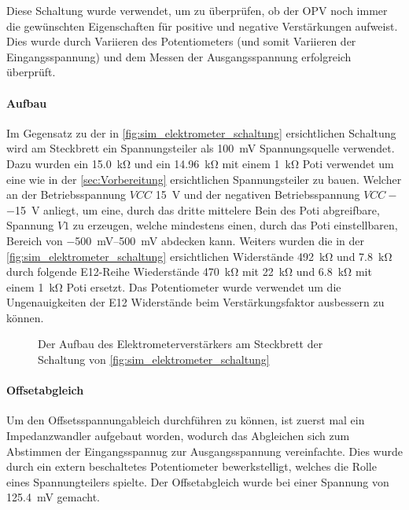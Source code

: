 \documentclass[12pt,english,ngerman]{scrartcl}
\begin{document}
Diese Schaltung wurde verwendet, um zu überprüfen, ob der OPV noch immer die
gewünschten Eigenschaften für positive und negative Verstärkungen aufweist. Dies
wurde durch Variieren des Potentiometers (und somit Variieren der
Eingangsspannung) und dem Messen der Ausgangsspannung erfolgreich überprüft.

\paragraph{Aufbau}
Im Gegensatz zu der in \autoref{fig:sim_elektrometer_schaltung} ersichtlichen
Schaltung wird am Steckbrett ein Spannungsteiler als \SI{100}{mV}
Spannungsquelle verwendet. Dazu wurden ein \SI{15.0}{\kilo\ohm} und ein
\SI{14.96}{\kilo\ohm} mit einem \SI{1}{\kilo\ohm} Poti verwendet um eine wie in
der \autoref{sec:Vorbereitung} ersichtlichen Spannungsteiler zu bauen. Welcher
an der Betriebsspannung $VCC$ \SI{+15}{\volt} und der negativen
Betriebsspannung $VCC-$ \SI{-15}{\volt} anliegt, um eine, durch das dritte
mittelere Bein des Poti abgreifbare, Spannung $V1$ zu erzeugen, welche
mindestens einen, durch das Poti einstellbaren, Bereich von
\SIrange{-500}{500}{\milli\volt} abdecken kann. Weiters wurden die in der
\autoref{fig:sim_elektrometer_schaltung} ersichtlichen Widerstände
\SI{492}{\kilo\ohm} und \SI{7.8}{\kilo\ohm} durch folgende E12-Reihe
Wiederstände \SI{470}{\kilo\ohm} mit \SI{22}{\kilo\ohm} und \SI{6.8}{\kilo\ohm}
mit einem \SI{1}{\kilo\ohm} Poti ersetzt. Das Potentiometer wurde verwendet um
die Ungenauigkeiten der E12 Widerstände beim Verstärkungsfaktor ausbessern zu
können.

\begin{figure}[H]
  \centering
  \caption{Der Aufbau des Elektrometerverstärkers am Steckbrett der Schaltung von
  \autoref{fig:sim_elektrometer_schaltung}}
  \label{fig:ver_elektromete_aufbau}
\end{figure}

\paragraph{Offsetabgleich}\label{sec:offsetabgleich}
Um den Offsetsspannungableich durchführen zu können, ist zuerst mal ein
Impedanzwandler aufgebaut worden, wodurch das Abgleichen sich zum Abstimmen
der Eingangsspannug zur Ausgangsspannung vereinfachte. Dies wurde durch ein
extern beschaltetes Potentiometer bewerkstelligt, welches die Rolle eines
Spannungteilers spielte. Der Offsetabgleich wurde bei einer Spannung von
\SI{125.4}{\milli\volt} gemacht.
\end{document}
